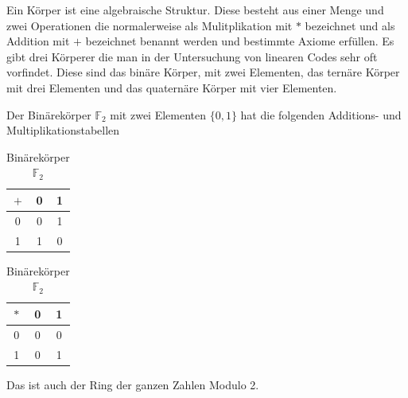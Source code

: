     
    
\begin{definition}[Körper]
    Ein Körper ist eine algebraische Struktur. Diese besteht aus einer Menge und zwei Operationen die normalerweise als Mulitplikation mit $*$
    bezeichnet und als Addition mit $+$ bezeichnet benannt werden und bestimmte Axiome erfüllen. 
    Es gibt drei Körperer die man in der Untersuchung von linearen Codes sehr oft vorfindet. Diese sind das binäre Körper, mit zwei Elementen, das ternäre Körper mit drei Elementen und das quaternäre Körper mit vier Elementen. 
    
    \newpage
    Der Binärekörper $\mathbb{F}_2$ mit zwei Elementen \( \{0, 1\} \) hat die folgenden Additions- und Multiplikationstabellen
    
    \begin{table}[!h]
        \begin{center}
            \caption{Binärekörper $\mathbb{F}_2$}
            \label{tab:binäre Körper}
        \begin{tabular}{c|cc}
            
            $+$ & 0 & 1 \\
            \hline
            0 & 0 & 1 \\
            
            1 & 1 & 0 \\
            
            \end{tabular}
        \end{center}
        \end{table}
    
    \hfill
    
    \begin{table}[!h]
        \begin{center}
            \caption{Binärekörper $\mathbb{F}_2$}
            \label{tab:binäre Körper2}
            \begin{tabular}{c|cc}
                
                $*$& 0 & 1 \\
                \hline
                0 & 0 & 0 \\
                
                1 & 0 & 1 \\
                
                \end{tabular}
        \end{center}
        \end{table}
    \FloatBarrier
    Das ist auch der Ring der ganzen Zahlen Modulo 2. \\
    

\end{definition}
